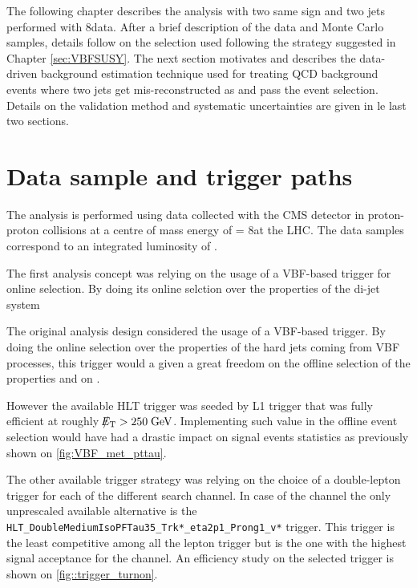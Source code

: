 
The following chapter describes the analysis with two same sign \hadtau and two jets performed with 8\tev data. After a brief description of the data and Monte Carlo samples, details follow on the selection used following the strategy suggested in Chapter \ref{sec:VBFSUSY}. The next section motivates and describes the data-driven background estimation technique used for treating QCD background events where two jets get mis-reconstructed as \hadtau and pass the event selection. Details on the validation method and systematic uncertainties are given in le last two sections.

\section {Data sample and trigger paths}

The analysis is performed using data collected with the CMS detector
in proton-proton collisions at a centre of mass energy of \CM = 8\tev at the LHC. The data samples correspond to an integrated luminosity of \lumiOld. 

The first analysis concept was relying on the usage of a VBF-based trigger for online selection. By doing its online selction  over the properties of the di-jet system

The original analysis design considered the usage of a VBF-based trigger. By doing the online selection over the properties of the hard jets coming from VBF processes, this trigger would a given a great freedom on the offline selection of the \hadtau properties and on \met.

However the available HLT trigger was seeded by \met L1 trigger that was fully efficient at roughly $\slash\mkern-12mu{E}_{\text{T}} > 250\;\text{Ge}\kern-0.06667em\text{V}$. Implementing such value in the offline event selection would have had a drastic impact on signal events statistics as previously shown on \autoref{fig:VBF_met_pttau}.

The other available trigger strategy was relying on the choice of a double-lepton trigger for each of the different search channel. In case of the \hadtau\hadtau channel the only unprescaled available alternative is the \texttt{HLT\_\-DoubleMedium\-IsoPFTau35\_\-Trk*\_\-eta2p1\_\-Prong1\_\-v*} trigger. This trigger is the least competitive among all the lepton trigger but is the one with the highest signal acceptance for the \hadtau channel. An efficiency study on the selected trigger is shown on \autoref{fig::trigger_turnon}.


